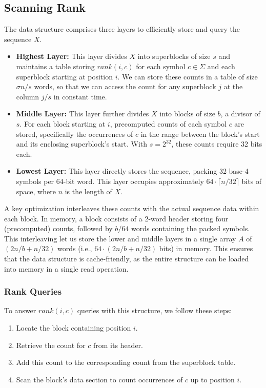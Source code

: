 \subsection{Scanning Rank}

The data structure comprises three layers to efficiently store and query the sequence \(X\).


\begin{itemize}
    \item \textbf{Highest Layer:} This layer divides \(X\) into superblocks of size \(s\) and maintains a table storing $rank(i,c)$ for each symbol $c \in \Sigma$ and each superblock starting at position \(i\). We can store these counts in a table of size $\sigma n / s$ words, so that we can access the count for any superblock $j$ at the column $j/s$ in constant time.
    \item \textbf{Middle Layer:} This layer further divides \(X\) into blocks of size \(b\), a divisor of \(s\). For each block starting at \(i\), precomputed counts of each symbol \(c\) are stored, specifically the occurrences of \(c\) in the range between the block's start and its enclosing superblock's start. With \(s=2^{32}\), these counts require 32 bits each.
    \item \textbf{Lowest Layer:} This layer directly stores the sequence, packing 32 base-4 symbols per 64-bit word. This layer occupies approximately $64 \cdot \lceil n/32 \rceil$ bits of space, where \(n\) is the length of \(X\).
\end{itemize}

\noindent A key optimization interleaves these counts with the actual sequence data within each block. In memory, a block consists of a 2-word header storing four (precomputed) counts, followed by \(b/64\) words containing the packed symbols. This interleaving let us store the lower and middle layers in a single array $A$ of $(2n/b + n/32)$ words (i.e., $64 \cdot (2n/b + n/32)$ bits) in memory. This ensures that the data structure is cache-friendly, as the entire structure can be loaded into memory in a single read operation.

\subsubsection*{Rank Queries}

\noindent To answer \(rank(i,c)\) queries with this structure, we follow these steps:
\begin{enumerate}
    \item Locate the block containing position \(i\).
    \item Retrieve the count for \(c\) from its header.
    \item Add this count to the corresponding count from the superblock table.
    \item Scan the block's data section to count occurrences of \(c\) up to position \(i\).
\end{enumerate}


